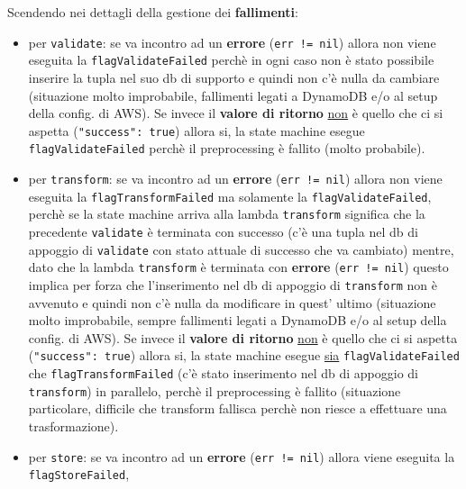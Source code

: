 \documentclass[
    sigconf, 
    screen=false, 
    acmthm=false, 
    nonacm
]{acmart}
\begin{document}
Scendendo nei dettagli della gestione dei \textbf{fallimenti}:
\begin{itemize}
    \item per \texttt{validate}: se va incontro ad un \textbf{errore} (\texttt{err != nil}) allora non viene 
    eseguita la \texttt{flagValidateFailed} 
    perchè in ogni caso non è stato possibile inserire la tupla nel suo db di supporto e quindi non c'è nulla da 
    cambiare (situazione molto improbabile, fallimenti legati a DynamoDB e/o al setup della config. di AWS). Se 
    invece il \textbf{valore di ritorno} \underline{non} è quello che ci si aspetta (\texttt{"success": true}) 
    allora si, la state machine esegue
    \texttt{flagValidateFailed} perchè il preprocessing è fallito (molto probabile).
    \item per \texttt{transform}: se va incontro ad un \textbf{errore} (\texttt{err != nil}) allora non viene 
    eseguita la \texttt{flagTransformFailed}
    ma solamente la \texttt{flagValidateFailed}, perchè se la state machine arriva alla lambda \texttt{transform} significa che la
    precedente \texttt{validate} è terminata con successo (c'è una tupla nel db di appoggio di \texttt{validate} 
    con stato attuale
    di successo che va cambiato) mentre, dato che la lambda \texttt{transform} è terminata con \textbf{errore} 
    (\texttt{err != nil}) questo implica per forza che
    l'inserimento nel db di appoggio di \texttt{transform} non è avvenuto e quindi non c'è nulla da modificare in quest'
    ultimo (situazione molto improbabile, sempre fallimenti legati a DynamoDB e/o al setup della config. di AWS).
    Se invece il \textbf{valore di ritorno} \underline{non} è quello che ci si aspetta (\texttt{"success": true}) 
    allora si, la state machine esegue
    \underline{sia} \texttt{flagValidateFailed} che \texttt{flagTransformFailed} (c'è stato inserimento nel db di 
    appoggio di \texttt{transform}) in parallelo,
    perchè il preprocessing è fallito (situazione particolare, difficile che transform fallisca perchè non riesce a 
    effettuare una trasformazione).
    \item per \texttt{store}: se va incontro ad un \textbf{errore} (\texttt{err != nil}) allora viene eseguita la 
    \texttt{flagStoreFailed},
    

\end{itemize}
\end{document}
